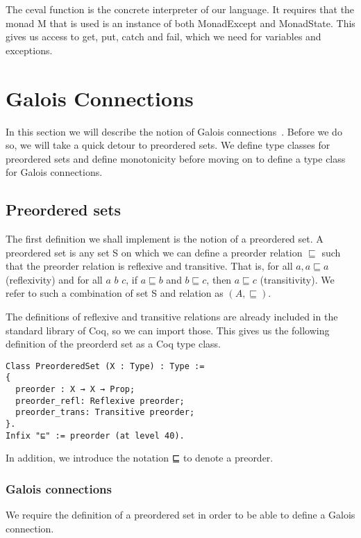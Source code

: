 The ceval function is the concrete interpreter of our language. It requires
that the monad M that is used is an instance of both MonadExcept and
MonadState. This gives us access to get, put, catch and fail, which we need for
variables and exceptions.

\section{Galois Connections}
In this section we will describe the notion of Galois
connections~\cite{cousot1992comparing}. 
Before we do
so, we will take a quick detour to preordered sets. We define type classes for
preordered sets and define monotonicity before moving on to define a type 
class for Galois connections.

\subsection{Preordered sets}
The first definition we shall implement is the notion of a preordered set. 
A preordered set is any set S on which we can define a preorder relation
$\sqsubseteq$ such that the preorder relation is reflexive and transitive. That
is, for all $a, a \sqsubseteq a$ (reflexivity) and for all $a$ $b$ $c$, if $a
\sqsubseteq b$ and $b \sqsubseteq c$, then $a \sqsubseteq c$ (transitivity).
We refer to such a combination of set S and relation as $(A, \sqsubseteq)$.

The definitions of reflexive and transitive relations are already included in
the standard library of Coq, so we can import those. This gives us the
following definition of the preorderd set as a Coq type class.

\begin{listing}
\begin{verbatim}
Class PreorderedSet (X : Type) : Type :=
{
  preorder : X → X → Prop;
  preorder_refl: Reflexive preorder;
  preorder_trans: Transitive preorder;
}.
Infix "⊑" := preorder (at level 40).
\end{verbatim}
\end{listing}

In addition, we introduce the notation ⊑ to denote a preorder.

\subsubsection{Galois connections}
We require the definition of a preordered set in order to be able to define a
Galois connection.

